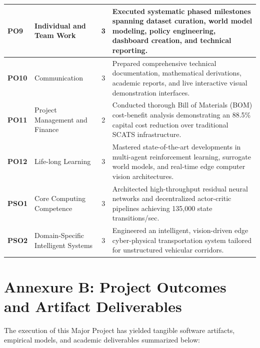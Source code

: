 \begin{small}
\begin{longtable}{|p{1.8cm}|p{2.8cm}|c|p{8.2cm}|}
\textbf{PO9} & Individual and Team Work & 3 & Executed systematic phased milestones spanning dataset curation, world model modeling, policy engineering, dashboard creation, and technical reporting. \\ \hline
\textbf{PO10} & Communication & 3 & Prepared comprehensive technical documentation, mathematical derivations, academic reports, and live interactive visual demonstration interfaces. \\ \hline
\textbf{PO11} & Project Management and Finance & 2 & Conducted thorough Bill of Materials (BOM) cost-benefit analysis demonstrating an 88.5\% capital cost reduction over traditional SCATS infrastructure. \\ \hline
\textbf{PO12} & Life-long Learning & 3 & Mastered state-of-the-art developments in multi-agent reinforcement learning, surrogate world models, and real-time edge computer vision architectures. \\ \hline
\textbf{PSO1} & Core Computing Competence & 3 & Architected high-throughput residual neural networks and decentralized actor-critic pipelines achieving 135,000 state transitions/sec. \\ \hline
\textbf{PSO2} & Domain-Specific Intelligent Systems & 3 & Engineered an intelligent, vision-driven edge cyber-physical transportation system tailored for unstructured vehicular corridors. \\
\end{longtable}
\end{small}

\chapter*{Annexure B: Project Outcomes and Artifact Deliverables}
\label{annex:outcomes}

The execution of this Major Project has yielded tangible software artifacts, empirical models, and academic deliverables summarized below:

